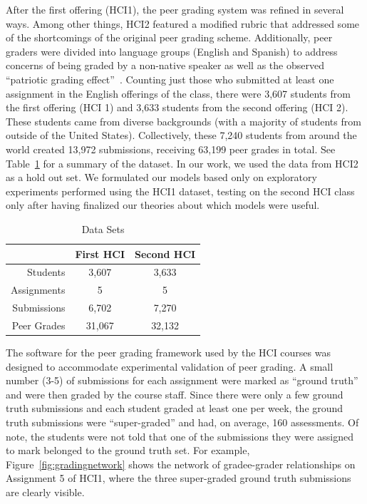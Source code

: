 After the first offering (HCI1), the peer grading system was refined in several ways. Among other things, HCI2 featured a modified rubric that
addressed some of the shortcomings of the original peer grading scheme. Additionally, peer graders were divided into language groups
(English and Spanish) to address concerns of being graded
by a non-native speaker as well as the observed ``patriotic
grading effect''~\cite{kulkarni13}.  
Counting just those who submitted at least one assignment 
in the English offerings of the class, there were 3,607 students 
from the first offering (HCI 1) and 3,633 students
from the second offering (HCI 2).  These students came from diverse backgrounds
 (with a majority of students from outside of the United States). 
 Collectively, these 7,240 students from around the world 
created 13,972 submissions, receiving 63,199 peer grades in total. See Table~\ref{tab:datasets} for a summary of the dataset.
In our work, we used the data
from HCI2 as a hold out set. We formulated our models based only on exploratory experiments performed using the HCI1 dataset, testing on the second HCI
class only after having finalized our theories about which
models were useful.

\begin{table}[t!]
\caption[Tuned peer grading dataset summary]{Data Sets}
\begin{center}
\begin{tabular}{rcc}
\hline
 &  First HCI & Second HCI \\
\hline
Students  & 3,607  &  3,633\\
Assignments & 5  &  5\\
Submissions & 6,702 & 7,270\\
Peer Grades & 31,067  &  32,132\\
\hline
\end{tabular}
\end{center}
\label{tab:datasets}

\end{table}


The software for the peer grading framework
used by the HCI courses was designed to accommodate experimental validation of peer grading. A small number (3-5)
of submissions for each assignment were marked as ``ground
truth'' and were then graded by the course staff. Since there
were only a few ground truth submissions and each student
graded at least one per week, the ground truth submissions
were ``super-graded'' and had, on average, 160 assessments.
Of note, the students were not told that one of the submissions they were assigned to mark belonged to the ground truth set. For
example, Figure~\ref{fig:gradingnetwork} shows the network of gradee-grader relationships on Assignment 5 of HCI1, where the three super-graded ground truth submissions are clearly visible. %
